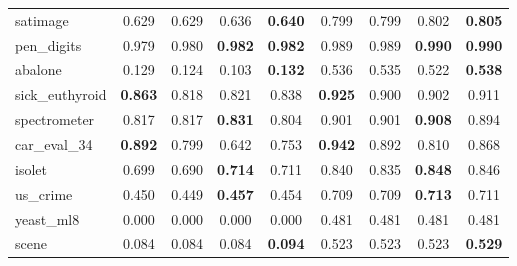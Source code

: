 \begin{figure}[ht]
\begin{tabular}{p{22mm}|*4{p{14mm}}|*4{p{14mm}}}
        satimage&\multicolumn{1}{c}{0.629}&\multicolumn{1}{c}{0.629}&\multicolumn{1}{c}{0.636}&\multicolumn{1}{c|}{\textbf{0.640}}&\multicolumn{1}{c}{0.799}&\multicolumn{1}{c}{0.799}&\multicolumn{1}{c}{0.802}&\multicolumn{1}{c}{\textbf{0.805}}\\
        pen\_digits&\multicolumn{1}{c}{0.979}&\multicolumn{1}{c}{0.980}&\multicolumn{1}{c}{\textbf{0.982}}&\multicolumn{1}{c|}{\textbf{0.982}}&\multicolumn{1}{c}{0.989}&\multicolumn{1}{c}{0.989}&\multicolumn{1}{c}{\textbf{0.990}}&\multicolumn{1}{c}{\textbf{0.990}}\\
        abalone&\multicolumn{1}{c}{0.129}&\multicolumn{1}{c}{0.124}&\multicolumn{1}{c}{0.103}&\multicolumn{1}{c|}{\textbf{0.132}}&\multicolumn{1}{c}{0.536}&\multicolumn{1}{c}{0.535}&\multicolumn{1}{c}{0.522}&\multicolumn{1}{c}{\textbf{0.538}}\\
        sick\_euthyroid&\multicolumn{1}{c}{\textbf{0.863}}&\multicolumn{1}{c}{0.818}&\multicolumn{1}{c}{0.821}&\multicolumn{1}{c|}{0.838}&\multicolumn{1}{c}{\textbf{0.925}}&\multicolumn{1}{c}{0.900}&\multicolumn{1}{c}{0.902}&\multicolumn{1}{c}{0.911}\\
        spectrometer&\multicolumn{1}{c}{0.817}&\multicolumn{1}{c}{0.817}&\multicolumn{1}{c}{\textbf{0.831}}&\multicolumn{1}{c|}{0.804}&\multicolumn{1}{c}{0.901}&\multicolumn{1}{c}{0.901}&\multicolumn{1}{c}{\textbf{0.908}}&\multicolumn{1}{c}{0.894}\\
        car\_eval\_34&\multicolumn{1}{c}{\textbf{0.892}}&\multicolumn{1}{c}{0.799}&\multicolumn{1}{c}{0.642}&\multicolumn{1}{c|}{0.753}&\multicolumn{1}{c}{\textbf{0.942}}&\multicolumn{1}{c}{0.892}&\multicolumn{1}{c}{0.810}&\multicolumn{1}{c}{0.868}\\
        isolet&\multicolumn{1}{c}{0.699}&\multicolumn{1}{c}{0.690}&\multicolumn{1}{c}{\textbf{0.714}}&\multicolumn{1}{c|}{0.711}&\multicolumn{1}{c}{0.840}&\multicolumn{1}{c}{0.835}&\multicolumn{1}{c}{\textbf{0.848}}&\multicolumn{1}{c}{0.846}\\
        us\_crime&\multicolumn{1}{c}{0.450}&\multicolumn{1}{c}{0.449}&\multicolumn{1}{c}{\textbf{0.457}}&\multicolumn{1}{c|}{0.454}&\multicolumn{1}{c}{0.709}&\multicolumn{1}{c}{0.709}&\multicolumn{1}{c}{\textbf{0.713}}&\multicolumn{1}{c}{0.711}\\
        yeast\_ml8&\multicolumn{1}{c}{0.000}&\multicolumn{1}{c}{0.000}&\multicolumn{1}{c}{0.000}&\multicolumn{1}{c|}{0.000}&\multicolumn{1}{c}{0.481}&\multicolumn{1}{c}{0.481}&\multicolumn{1}{c}{0.481}&\multicolumn{1}{c}{0.481}\\
        scene&\multicolumn{1}{c}{0.084}&\multicolumn{1}{c}{0.084}&\multicolumn{1}{c}{0.084}&\multicolumn{1}{c|}{\textbf{0.094}}&\multicolumn{1}{c}{0.523}&\multicolumn{1}{c}{0.523}&\multicolumn{1}{c}{0.523}&\multicolumn{1}{c}{\textbf{0.529}}\\

\end{tabular}
\end{figure}
